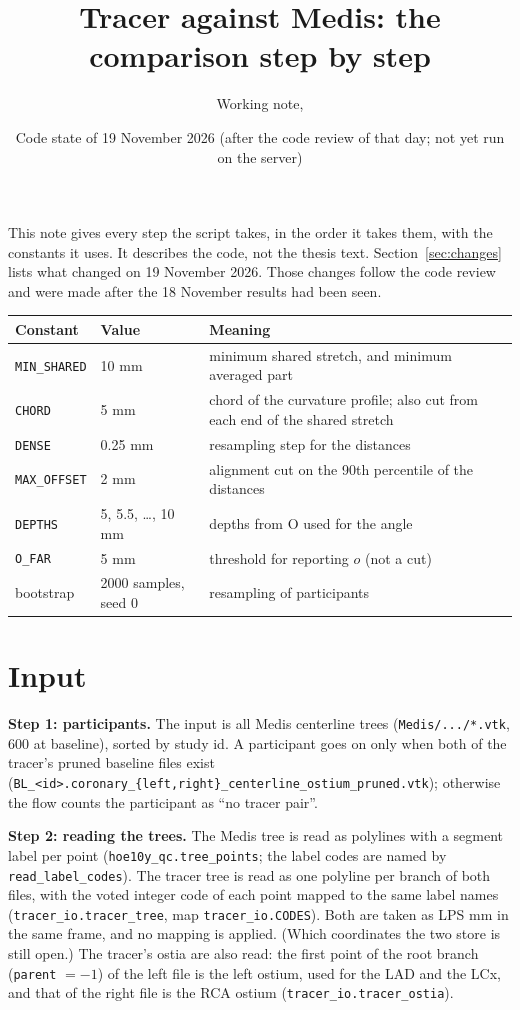\documentclass[11pt,a4paper]{article}
\title{Tracer against Medis: the comparison step by step}
\author{Working note, \code{CGPS\_data/thesis\_final/medis\_compare.py}}
\date{Code state of 19 November 2026 (after the code review of that day; not yet run on the server)}
\newcommand{\code}[1]{\texttt{#1}}
\begin{document}
\maketitle

\noindent This note gives every step the script takes, in the order it takes them, with the constants
it uses. It describes the code, not the thesis text. Section~\ref{sec:changes} lists what changed on
19 November 2026. Those changes follow the code review and were made after the 18 November results had
been seen.

\begin{table}[h]
\centering
\begin{tabular}{@{}llp{8.2cm}@{}}
\toprule
Constant & Value & Meaning \\
\midrule
\code{MIN\_SHARED} & 10 mm & minimum shared stretch, and minimum averaged part \\
\code{CHORD} & 5 mm & chord of the curvature profile; also cut from each end of the shared stretch \\
\code{DENSE} & 0.25 mm & resampling step for the distances \\
\code{MAX\_OFFSET} & 2 mm & alignment cut on the 90th percentile of the distances \\
\code{DEPTHS} & 5, 5.5, \dots, 10 mm & depths from O used for the angle \\
\code{O\_FAR} & 5 mm & threshold for reporting $o$ (not a cut) \\
bootstrap & 2000 samples, seed 0 & resampling of participants \\
\bottomrule
\end{tabular}
\end{table}

\section{Input}

\textbf{Step 1: participants.} The input is all Medis centerline trees (\code{Medis/.../*.vtk}, 600 at
baseline), sorted by study id. A participant goes on only when both of the tracer's pruned baseline files
exist (\code{BL\_<id>.coronary\_\{left,right\}\_centerline\_ostium\_pruned.vtk}); otherwise the flow
counts the participant as ``no tracer pair''.

\textbf{Step 2: reading the trees.} The Medis tree is read as polylines with a segment label per point
(\code{hoe10y\_qc.tree\_points}; the label codes are named by \code{read\_label\_codes}). The tracer tree
is read as one polyline per branch of both files, with the voted integer code of each point mapped to the
same label names (\code{tracer\_io.tracer\_tree}, map \code{tracer\_io.CODES}). Both are taken as LPS mm
in the same frame, and no mapping is applied. (Which coordinates the two store is still open.) The
tracer's ostia are also read: the first point of the root branch (\code{parent} $=-1$) of the left file is
the left ostium, used for the LAD and the LCx, and that of the right file is the RCA ostium
(\code{tracer\_io.tracer\_ostia}).
\end{document}
